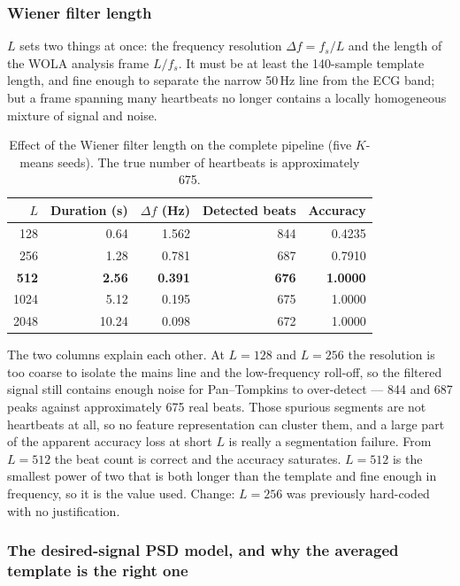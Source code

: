 \documentclass[11pt,a4paper]{article}
\newcommand{\hertz}{Hz}
\newcommand{\num}[1]{#1}
\newcommand{\SI}[2]{#1\,#2}
\newcommand{\change}[1]{\textcolor{black!70}{\textsf{\footnotesize #1}}}
\begin{document}
\subsubsection{Wiener filter length}
\label{sec:p1L}

$L$ sets two things at once: the frequency resolution $\Delta f=f_s/L$ and the length of the
WOLA analysis frame $L/f_s$. It must be at least the \num{140}-sample template length, and
fine enough to separate the narrow \SI{50}{\hertz} line from the ECG band; but a frame
spanning many heartbeats no longer contains a locally homogeneous mixture of signal and noise.

\begin{table}[htbp]
\centering\small
\caption{Effect of the Wiener filter length on the complete pipeline (five $K$-means seeds).
         The true number of heartbeats is approximately \num{675}.}
\label{tab:p1L}
\begin{tabular}{rrrrr}
\toprule
$L$ & Duration (s) & $\Delta f$ (Hz) & Detected beats & Accuracy \\
\midrule
 128 & 0.64  & 1.562 & 844 & 0.4235 \\
 256 & 1.28  & 0.781 & 687 & 0.7910 \\
 \textbf{512} & \textbf{2.56}  & \textbf{0.391} & \textbf{676} & \textbf{1.0000} \\
1024 & 5.12  & 0.195 & 675 & 1.0000 \\
2048 & 10.24 & 0.098 & 672 & 1.0000 \\
\bottomrule
\end{tabular}
\end{table}

The two columns explain each other. At $L=128$ and $L=256$ the resolution is too coarse to
isolate the mains line and the low-frequency roll-off, so the filtered signal still contains
enough noise for Pan--Tompkins to over-detect --- \num{844} and \num{687} peaks against
approximately \num{675} real beats. Those spurious segments are not heartbeats at all, so no
feature representation can cluster them, and a large part of the apparent accuracy loss at
short $L$ is really a segmentation failure. From $L=512$ the beat count is correct and the
accuracy saturates. $L=512$ is the smallest power of two that is both longer than the template
and fine enough in frequency, so it is the value used.
\change{Change: $L=256$ was previously hard-coded with no justification.}

\subsubsection{The desired-signal PSD model, and why the averaged template is the right one}
\label{sec:p1sd}
\end{document}
